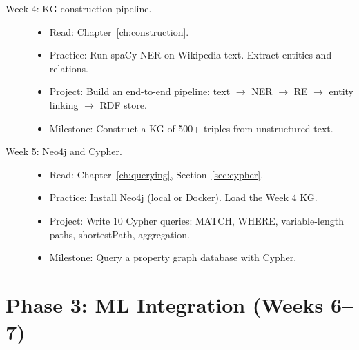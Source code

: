 \documentclass[11pt,a4paper,oneside,openany]{book}
\theoremstyle{definition}
\theoremstyle{plain}
\theoremstyle{remark}
\begin{document}
\begin{description}
	\item[Week 4: KG construction pipeline.]
	      \begin{itemize}
		      \item Read: Chapter~\ref{ch:construction}.
		      \item Practice: Run spaCy NER on Wikipedia text. Extract entities and relations.
		      \item Project: Build an end-to-end pipeline: text $\to$ NER $\to$ RE $\to$ entity linking $\to$ RDF store.
		      \item Milestone: Construct a KG of 500+ triples from unstructured text.
	      \end{itemize}

	\item[Week 5: Neo4j and Cypher.]
	      \begin{itemize}
		      \item Read: Chapter~\ref{ch:querying}, Section~\ref{sec:cypher}.
		      \item Practice: Install Neo4j (local or Docker). Load the Week 4 KG.
		      \item Project: Write 10 Cypher queries: MATCH, WHERE, variable-length paths, shortestPath, aggregation.
		      \item Milestone: Query a property graph database with Cypher.
	      \end{itemize}
\end{description}

\section{Phase 3: ML Integration (Weeks 6--7)}\label{sec:phase3}
\end{document}
